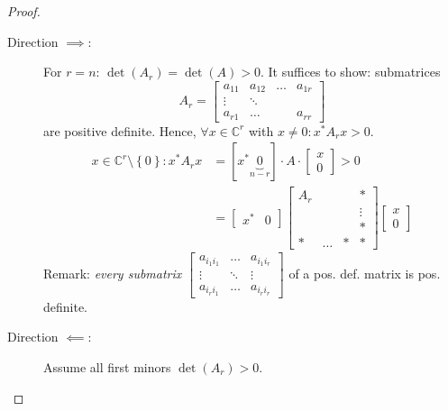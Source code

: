 \documentclass[a4paper]{article}
\numberwithin{lecref}{section}
\newcommand{\set}[1]{\left\{#1\right\}}
\begin{document}
\begin{proof}\hfill{}
  \begin{description}
    \item[Direction $\implies$:] 
      For $r = n$: $\det(A_r) = \det(A) > 0$.
      It suffices to show: submatrices
      \[ A_r = \begin{bmatrix} a_{11} & a_{12} & \ldots & a_{1r} \\ \vdots & \ddots & & \\ a_{r1} & \dots & & a_{rr} \end{bmatrix} \]
      are positive definite.
      Hence, $\forall x \in \mathbb C^r$ with $x \neq 0: x^* A_r x > 0$.
      \begin{align*}
        x \in \mathbb C^r \setminus \set{0}: x^* A_r x &= \left[x^* \underbrace{0}_{n - r}\right] \cdot A \cdot \begin{bmatrix} x \\ 0 \end{bmatrix} > 0 \\
          &= \begin{bmatrix} x^* & 0 \end{bmatrix} \begin{bmatrix} A_r & & & * \\ & & & \vdots \\ & & & * \\ * & \ldots & * & * \end{bmatrix} \begin{bmatrix} x \\ 0\end{bmatrix}
      \end{align*}
      Remark: \emph{every submatrix}
      $\begin{bmatrix} a_{i_1 i_1} & \ldots & a_{i_1 i_r} \\ \vdots & \ddots & \vdots \\ a_{i_r i_1} & \ldots & a_{i_r i_r} \end{bmatrix}$
      of a pos. def. matrix is pos. definite.
    \item[Direction $\impliedby$:]
      Assume all first minors $\det(A_r) > 0$.


\end{description}
\end{proof}
\end{document}
